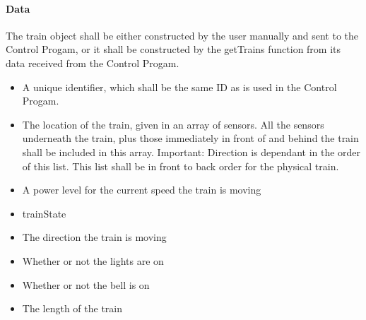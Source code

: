 \documentclass[a4paper,11pt,notitlepage]{article}
\def\CS{Control Progam\xspace} \def\LC{Local Copy of Train State\xspace} \def\TN{Track Node\xspace}
\begin{document}
\paragraph{Data}
The train object shall be either constructed by the user manually and sent to the \CS, or it shall be constructed by the getTrains function from its data received from the \CS.
\begin{itemize}
\item A unique identifier, which shall be the same ID as is used in the \CS.
\item The location of the train, given in an array of sensors. All the sensors underneath the train, plus those immediately in front of and behind the train shall be included in this array. Important: Direction is dependant in the order of this list. This list shall be in front to back order for the physical train.
\item A power level for the current speed the train is moving
\item trainState
\item The direction the train is moving
\item Whether or not the lights are on
\item Whether or not the bell is on
\item The length of the train
\end{itemize}
\end{document}

